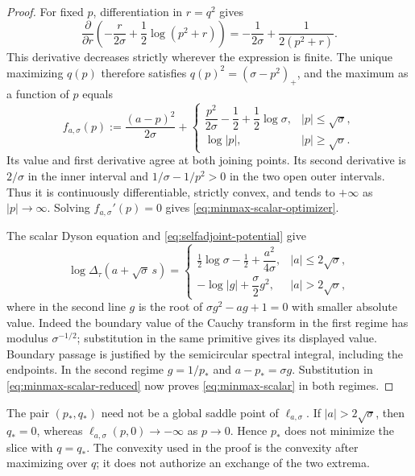\begin{proof}
For fixed $p$, differentiation in $r=q^2$ gives
\[
 \frac{\partial}{\partial r}
 \left(-\frac r{2\sigma}+\frac12\log(p^2+r)\right)
 =-\frac1{2\sigma}+\frac1{2(p^2+r)}.
\]
This derivative decreases strictly wherever the expression is finite.
The unique maximizing $q(p)$ therefore satisfies $q(p)^2=(\sigma-p^2)_+$, and the maximum as a function of $p$ equals
\begin{equation}\label{eq:minmax-scalar-reduced}
 f_{a,\sigma}(p):=\frac{(a-p)^2}{2\sigma}
 +\begin{cases}
    \dfrac{p^2}{2\sigma}-\dfrac12+\dfrac12\log\sigma,
          &|p|\le\sqrt\sigma,\\[3pt]
    \log|p|,&|p|\ge\sqrt\sigma.
  \end{cases}
\end{equation}
Its value and first derivative agree at both joining points.
Its second derivative is $2/\sigma$ in the inner interval and $1/\sigma-1/p^2>0$ in the two open outer intervals.
Thus it is continuously differentiable, strictly convex, and tends to $+\infty$ as $|p|\to\infty$.
Solving $f_{a,\sigma}'(p)=0$ gives \eqref{eq:minmax-scalar-optimizer}.

The scalar Dyson equation and \eqref{eq:selfadjoint-potential} give
\[
 \log\Delta_\tau(a+\sqrt\sigma\,s)
 =\begin{cases}
   \frac12\log\sigma-\frac12+\dfrac{a^2}{4\sigma},
              &|a|\le2\sqrt\sigma,\\[3pt]
   -\log|g|+\dfrac\sigma2g^2,&|a|>2\sqrt\sigma,
  \end{cases}
\]
where in the second line $g$ is the root of $\sigma g^2-ag+1=0$ with smaller absolute value.
Indeed the boundary value of the Cauchy transform in the first regime has modulus $\sigma^{-1/2}$; substitution in the same primitive gives its displayed value.
Boundary passage is justified by the semicircular spectral integral, including the endpoints.
In the second regime $g=1/p_*$ and $a-p_*=\sigma g$.
Substitution in \eqref{eq:minmax-scalar-reduced} now proves \eqref{eq:minmax-scalar} in both regimes.
\end{proof}

The pair $(p_*,q_*)$ need not be a global saddle point of $\ell_{a,\sigma}$.
If $|a|>2\sqrt\sigma$, then $q_*=0$, whereas $\ell_{a,\sigma}(p,0)\to-\infty$ as $p\to0$.
Hence $p_*$ does not minimize the slice with $q=q_*$.
The convexity used in the proof is the convexity after maximizing over $q$; it does not authorize an exchange of the two extrema.

